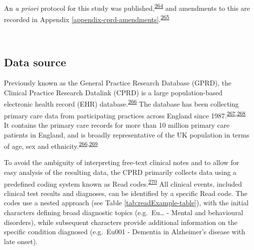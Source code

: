 \documentclass[a4paper, twoside]{templates/ociamthesis}
\begin{document}
An \emph{a priori} protocol for this study was published,\textsuperscript{\protect\hyperlink{ref-walker2016}{264}} and amendments to this are recorded in Appendix \ref{appendix-cprd-amendments}.\textsuperscript{\protect\hyperlink{ref-vonelm2008}{265}}

~

\hypertarget{cprd-data-source}{%
\subsection{Data source}\label{cprd-data-source}}

Previously known as the General Practice Research Database (GPRD), the Clinical Practice Research Datalink (CPRD) is a large population-based electronic health record (EHR) database.\textsuperscript{\protect\hyperlink{ref-herrett2015}{266}} The database has been collecting primary care data from participating practices across England since 1987.\textsuperscript{\protect\hyperlink{ref-williams2012}{267},\protect\hyperlink{ref-wood2001revitalizing}{268}} It contains the primary care records for more than 10 million primary care patients in England, and is broadly representative of the UK population in terms of age, sex and ethnicity.\textsuperscript{\protect\hyperlink{ref-herrett2015}{266},\protect\hyperlink{ref-mathur2014}{269}}

To avoid the ambiguity of interpreting free-text clinical notes and to allow for easy analysis of the resulting data, the CPRD primarily collects data using a predefined coding system known as Read codes.\textsuperscript{\protect\hyperlink{ref-booth1994}{270}} All clinical events, included clinical test results and diagnoses, can be identified by a specific Read code. The codes use a nested approach (see Table \ref{tab:readExample-table}), with the initial characters defining broad diagnostic topics (e.g.~Eu\ldots{} - Mental and behavioural disorders), while subsequent characters provide additional information on the specific condition diagnosed (e.g.~Eu001 - Dementia in Alzheimer's disease with late onset).

~
\end{document}
